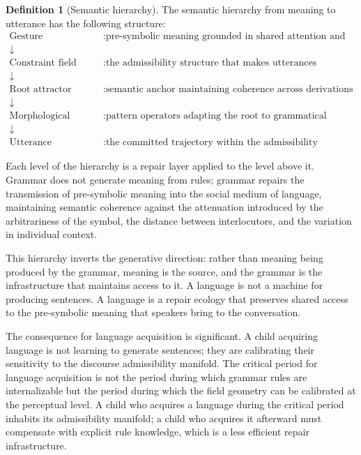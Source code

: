 \documentclass[11pt, a4paper]{article}
\theoremstyle{definition}
\newtheorem{definition}{Definition}
\theoremstyle{remark}
\begin{document}
\begin{definition}[Semantic hierarchy]
The semantic hierarchy from meaning to utterance has the following structure:
\begin{align*}
\text{Gesture} &: \text{pre-symbolic meaning grounded in shared attention and action} \\
\downarrow & \\
\text{Constraint field} &: \text{the admissibility structure that makes utterances receivable} \\
\downarrow & \\
\text{Root attractor} &: \text{semantic anchor maintaining coherence across derivations} \\
\downarrow & \\
\text{Morphological repair} &: \text{pattern operators adapting the root to grammatical context} \\
\downarrow & \\
\text{Utterance} &: \text{the committed trajectory within the admissibility manifold}
\end{align*}
\end{definition}

Each level of the hierarchy is a repair layer applied to the level above it.
Grammar does not generate meaning from rules; grammar repairs the transmission
of pre-symbolic meaning into the social medium of language, maintaining
semantic coherence against the attenuation introduced by the arbitrariness
of the symbol, the distance between interlocutors, and the variation in
individual context.

This hierarchy inverts the generative direction: rather than meaning being
produced by the grammar, meaning is the source, and the grammar is the
infrastructure that maintains access to it. A language is not a machine for
producing sentences. A language is a repair ecology that preserves shared
access to the pre-symbolic meaning that speakers bring to the conversation.

The consequence for language acquisition is significant. A child acquiring
language is not learning to generate sentences; they are calibrating their
sensitivity to the discourse admissibility manifold. The critical period for
language acquisition is not the period during which grammar rules are
internalizable but the period during which the field geometry can be calibrated
at the perceptual level. A child who acquires a language during the critical
period inhabits its admissibility manifold; a child who acquires it afterward
must compensate with explicit rule knowledge, which is a less efficient
repair infrastructure.
\end{document}
